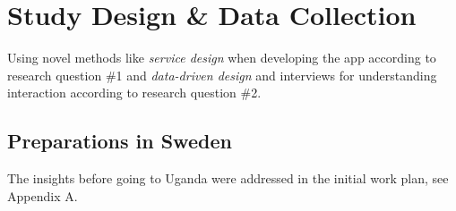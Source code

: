 \section{Study Design \& Data Collection}

Using novel methods like \textit{service design} when developing the app according to research question \#1 and \textit{data-driven design} and interviews for understanding interaction according to research question \#2.



\subsection{Preparations in Sweden}

The insights before going to Uganda were addressed in the initial work plan, see Appendix A. 





%



